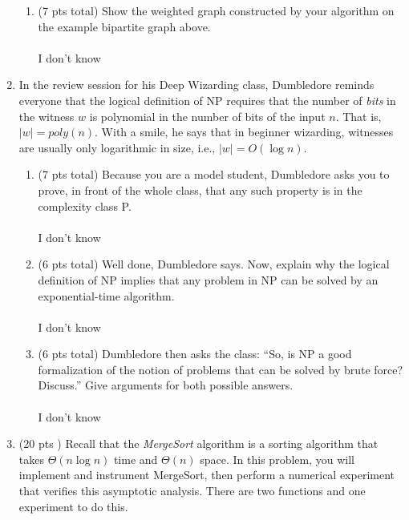 \documentclass[12pt]{article}
\begin{document}
\begin{enumerate}
\begin{enumerate}
\item (7 pts total) \label{1c} Show the weighted graph constructed by your algorithm on the example bipartite graph above.
\\ \\ I don't know
\pagebreak

\end{enumerate}
	
\item In the review session for his Deep Wizarding class,
    Dumbledore reminds everyone that the logical definition of NP requires that
        the number of \textit{bits} in the witness $w$ is polynomial in the
        number of bits of the input $n$. That is, $|w| = poly(n)$. With a
        smile, he says that in beginner wizarding, witnesses are usually only
        logarithmic in size, i.e., $|w| = O(\log n)$.  \begin{enumerate} 
\pagebreak
\item (7 pts total)  \label{2a} Because you are a model student, Dumbledore asks you to prove, in front
    of the whole class, that any such property is in the complexity class P.
\\ \\ I don't know
\pagebreak

\item (6 pts total) \label{2b} Well done, Dumbledore says. Now, explain why the logical definition of NP
    implies that any problem in NP can be solved by an exponential-time
    algorithm.
\\ \\ I don't know
\pagebreak

\item (6 pts total) \label{2c} Dumbledore then asks the class: ``So, is NP a good formalization of the
    notion of problems that can be solved by brute force?  Discuss.'' Give
    arguments for both possible answers.
\\ \\ I don't know
\pagebreak

\end{enumerate}

\item (20 pts ) Recall that the \textit{MergeSort} algorithm is a sorting
algorithm that takes $\Theta(n\log n)$ time and $\Theta(n)$ space. In this
problem, you will implement and instrument MergeSort, then perform a
numerical experiment that verifies this asymptotic analysis. There are two
functions and one experiment to do this.
	

\end{enumerate}
\end{document}
